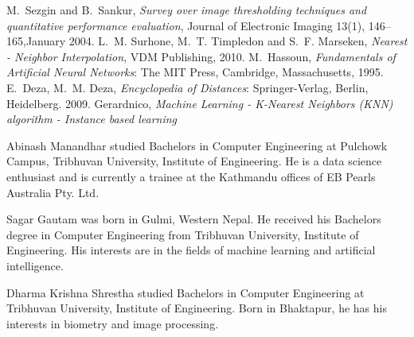 \documentclass[journal,twoside]{IEEEtran}
\begin{document}
\begin{thebibliography}{1}
\bibitem{}
M.~Sezgin and B.~Sankur, \emph{Survey over image thresholding techniques and quantitative performance evaluation}, Journal of Electronic Imaging 13(1), 146–165,January 2004.
\bibitem{}
L.~M. Surhone, M.~T. Timpledon and S.~F. Marseken, \emph{Nearest - Neighbor Interpolation}, VDM Publishing, 2010.
\bibitem{}
M.~Hassoun, \emph{Fundamentals of Artificial Neural Networks}: The MIT Press, Cambridge, Massachusetts, 1995.
\bibitem{} 
E.~Deza, M.~M. Deza, \emph{Encyclopedia of Distances}: Springer-Verlag, Berlin, Heidelberg. 2009.
\bibitem{}
Gerardnico, \emph{Machine Learning - K-Nearest Neighbors (KNN) algorithm - Instance based learning}    
\end{thebibliography}

\begin{IEEEbiography}{Abinash Manandhar} studied Bachelors in Computer Engineering at Pulchowk Campus, Tribhuvan University, Institute of Engineering. He is a data science enthusiast and is currently a trainee at the Kathmandu offices of EB Pearls Australia Pty. Ltd.
\end{IEEEbiography}
\vspace{-1cm}
\begin{IEEEbiography}{Sagar Gautam} was born in Gulmi, Western Nepal. He received his Bachelors degree in Computer Engineering from Tribhuvan University, Institute of Engineering. His interests are in the fields of machine learning and artificial intelligence.
\end{IEEEbiography}
\vspace{-1cm}
\begin{IEEEbiography}{Dharma Krishna Shrestha} studied Bachelors in Computer Engineering at Tribhuvan University, Institute of Engineering. Born in Bhaktapur, he has his interests in biometry and image processing.
\end{IEEEbiography}
\end{document}
